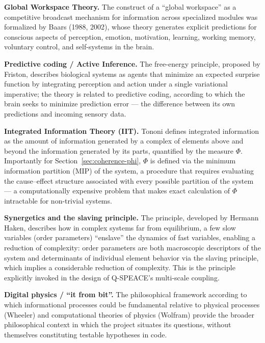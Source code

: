 \documentclass[11pt,a4paper]{article}
\begin{document}
\textbf{Global Workspace Theory.} The construct of a ``global workspace'' as a competitive broadcast mechanism for information across specialized modules was formalized by Baars (1988, 2002), whose theory generates explicit predictions for conscious aspects of perception, emotion, motivation, learning, working memory, voluntary control, and self-systems in the brain.

\textbf{Predictive coding / Active Inference.} The free-energy principle, proposed by Friston, describes biological systems as agents that minimize an expected surprise function by integrating perception and action under a single variational imperative; the theory is related to predictive coding, according to which the brain seeks to minimize prediction error --- the difference between its own predictions and incoming sensory data.

\textbf{Integrated Information Theory (IIT).} Tononi defines integrated information as the amount of information generated by a complex of elements above and beyond the information generated by its parts, quantified by the measure $\Phi$. Importantly for Section~\ref{sec:coherence-phi}, $\Phi$ is defined via the minimum information partition (MIP) of the system, a procedure that requires evaluating the cause--effect structure associated with every possible partition of the system --- a computationally expensive problem that makes exact calculation of $\Phi$ intractable for non-trivial systems.

\textbf{Synergetics and the slaving principle.} The principle, developed by Hermann Haken, describes how in complex systems far from equilibrium, a few slow variables (order parameters) ``enslave'' the dynamics of fast variables, enabling a reduction of complexity: order parameters are both macroscopic descriptors of the system and determinants of individual element behavior via the slaving principle, which implies a considerable reduction of complexity. This is the principle explicitly invoked in the design of Q-SPEACE's multi-scale coupling.

\textbf{Digital physics / ``it from bit''.} The philosophical framework according to which informational processes could be fundamental relative to physical processes (Wheeler) and computational theories of physics (Wolfram) provide the broader philosophical context in which the project situates its questions, without themselves constituting testable hypotheses in code.

\end{document}
